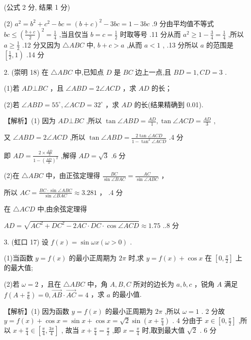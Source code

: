 \documentclass[10pt]{article}
\begin{document}
(公式 2 分, 结果 1 分)

(2) \({a}^{2} = {b}^{2} + {c}^{2} - {bc} = {\left( b + c\right) }^{2} - {3bc} = 1 - {3bc}\) .9 分由平均值不等式 \({bc} \leq  {\left( \frac{b + c}{2}\right) }^{2} = \frac{1}{4}\) ,当且仅当 \(b = c = \frac{1}{2}\) 时取等号 .11 分从而 \({a}^{2} \geq  1 - \frac{3}{4} = \frac{1}{4}\) ,所以 \(a \geq  \frac{1}{2}\) .12 分又因为 \(\bigtriangleup {ABC}\) 中, \(b + c > a\) ,从而 \(a < 1\) , .13 分所以 \(a\) 的范围是 \(\left\lbrack  {\frac{1}{2},1}\right)\) .14 分

2. (崇明 18) 在 \(\bigtriangleup {ABC}\) 中,已知点 \(D\) 是 \({BC}\) 边上一点,且 \({BD} = 1,{CD} = 3\) .

(1)若 \({AD}\bot {BC}\) ，且 \(\angle {ABD} = 2\angle {ACD}\) ，求 \({AD}\) 的长；

(2)若 \(\angle {ABD} = {55}^{ \circ  },\angle {ACD} = {32}^{ \circ  }\) ，求 \({AD}\) 的长(结果精确到 0.01).

【解析】(1) 因为 \({AD}\bot {BC}\) ,所以 \({\tan \angle {ABD}} = \frac{AD}{1},{\tan \angle {ACD}} = \frac{AD}{3}\) ,

又 \(\angle {ABD} = 2\angle {ACD}\) ,所以 \(\tan \angle {ABD} = \frac{2\tan \angle {ACD}}{1 - {\tan }^{2}\angle {ACD}}\) .4 分

即 \({AD} = \frac{2 \times  \frac{AD}{3}}{1 - {\left( \frac{AD}{3}\right) }^{2}}\) ,解得 \({AD} = \sqrt{3}\) .6 分

(2)在 \(\bigtriangleup  {ABC}\) 中，由正弦定理得 \(\frac{BC}{\sin \angle {BAC}} = \frac{AC}{\sin \angle {ABC}}\) ，

所以 \({AC} = \frac{{BC} \cdot  \sin \angle {ABC}}{\sin \angle {BAC}} \approx  {3.281}\) ， .4 分

在 \(\bigtriangleup {ACD}\) 中,由余弦定理得

\({AD} = \sqrt{A{C}^{2} + D{C}^{2} - {2AC} \cdot  {DC} \cdot  \cos \angle {ACD}} \approx  {1.75}\) ..8 分

3. (虹口 17) 设 \(f\left( x\right)  = \sin {\omega x}\left( {\omega  > 0}\right)\) .

(1)当函数 \(y = f\left( x\right)\) 的最小正周期为 \({2\pi }\) 时,求 \(y = f\left( x\right)  + \cos x\) 在 \(\left\lbrack  {0,\frac{\pi }{2}}\right\rbrack\) 上的最大值;

(2)若 \(\omega  = 2\) ，且在 \(\bigtriangleup  {ABC}\) 中，角 \(A,B,C\) 所对的边长为 \(a,b,c\) ，锐角 \(A\) 满足 \(f\left( {A + \frac{\pi }{6}}\right)  = 0,\overrightarrow{AB} \cdot  \overrightarrow{AC} = 4\) ，求 \(a\) 的最小值.

【解析】(1) 因为函数 \(y = f\left( x\right)\) 的最小正周期为 \({2\pi }\) ,所以 \(\omega  = 1\) . 2 分故 \(y = f\left( x\right)  + \cos x = \sin x + \cos x = \sqrt{2}\sin \left( {x + \frac{\pi }{4}}\right)\) . 4 分由于 \(x \in  \left\lbrack  {0,\frac{\pi }{2}}\right\rbrack\) ,所以 \(x + \frac{\pi }{4} \in  \left\lbrack  {\frac{\pi }{4},\frac{3\pi }{4}}\right\rbrack\) , 故当 \(x + \frac{\pi }{4} = \frac{\pi }{2}\) ,即 \(x = \frac{\pi }{4}\) 时,取到最大值 \(\sqrt{2}\) . 6 分
\end{document}
